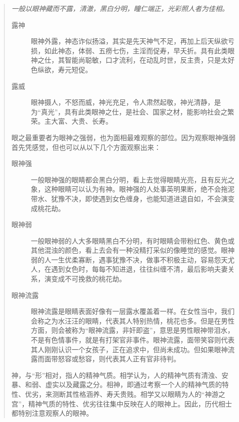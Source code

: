 \documentclass{ctexart}
\begin{document}
\begin{quotation}\it
    一般以眼神藏而不露，清澈，黑白分明，瞳仁端正，光彩照人者为佳相。

    \begin{description}
        \item[露神] 眼神外露，神态诈似扬溢，其实是先天神气不足，再加上后天纵欲亏损，如此神态，体弱、五痨七伤，主淫而促寿，早夭折。具有此类眼神之仕，其智能尚聪敏，口才流利，在动乱时世，反主贵，只是太好色纵欲，寿元短促。
        \item[露威] 眼神摄人，不怒而威，神光充足，令人肃然起敬，神光清静，是为“真光”，具有此类眼神之仕，是社会、国家之材，能影响社会之繁荣。主大富、大贵、长寿。
    \end{description}

    眼之最重要者为眼神之强弱，也为面相最难观察的部位。因为观察眼神强弱首先凭感觉，但也可以从以下几个方面观察出来：

    \begin{description}
        \item[眼神强] 一般眼神强的眼睛都会黑白分明，看上去觉得眼睛光亮，且有反光之象，这种眼睛可以认为有神。眼神强的人处事英明果断，绝不会拖泥带水、犹豫不决，即使遇到女色缠身，也能知道进退自如，不会演变成桃花劫。
        \item[眼神弱] 一般眼神弱的人大多眼睛黑白不分明，有时眼睛会带粉红色、黄色或其他混浊的颜色，看上去会有一种没精打采似的像睡觉的感觉。眼神弱的人一生优柔寡断，遇事犹豫不决，做事不积极主动，容易怨天尤人，在遇到女色时，每每不知进退，往往纠缠不清，最后影响夫妻关系，演变成不可挽救的桃花劫。
        \item[眼神流露] 眼神流露是眼睛表面好像有一层露水覆盖着一样。在女性当中，我们会称之为水汪汪的眼睛，代表其人特别热情，桃花也多。但是在男性方面，则会被称为“眼神流露，非奸即盗”，意思是男性眼神带泪水，不是有色情事件，就是有打架官非事件。眼神流露，面带笑容则代表其人刚刚认识一个女孩子，正在追求中，但尚未成功。但如果眼神流露而面带怒容或愁容，则代表其人正有官非待判。
    \end{description}

    神，与“形”相对，指人的精神气质。相学认为，人的精神气质有清浊、安暴、和弱、虚实以及藏露之分。相神，即通过考察一个人的精神气质的特性、优劣，来测断其性格涵养、寿夭贵贱。相学又以眼睛为人的“神游之宫”，精神气质的特性、优劣往往集中反映在人的眼神上。因此，历代相士都特别注意观察人的眼神。


\end{quotation}
\end{document}
